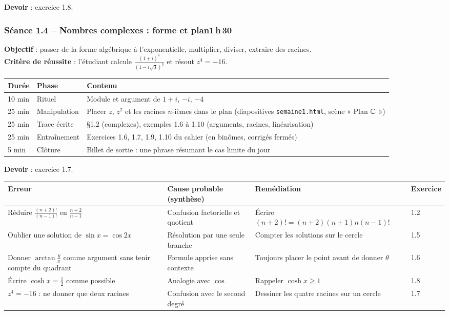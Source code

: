 \documentclass[10.5pt,a4paper]{article}
\newif\ifprof
\newcommand{\synth}{\textsf{\textcolor{ardoise}{(synthèse)}}}
\newcommand{\profonly}[1]{\ifprof #1\fi}
\begin{document}
\textbf{Devoir} : exercice 1.8.\profonly{ \textbf{Point de vigilance} : Cas $\cosh x=c<1$ sans solution réelle : à faire énoncer par un étudiant.}\par
{}\subsubsection*{\textcolor{marine}{Séance 1.4 -- Nombres complexes : forme et plan}\hfill\normalfont\small\textcolor{ardoise}{1\,h\,30}}
\begin{objectif}\textbf{Objectif} : passer de la forme algébrique à l'exponentielle, multiplier, diviser, extraire des racines.\\\textbf{Critère de réussite} : l'étudiant calcule $\frac{(1+i)^8}{(1-i\sqrt3)^3}$ et résout $z^4=-16$.\end{objectif}\nopagebreak
\begin{longtable}{@{}p{1.1cm}p{2.4cm}p{12.4cm}@{}}
\toprule \textbf{Durée} & \textbf{Phase} & \textbf{Contenu}\\ \midrule\endhead
10 min & Rituel & Module et argument de $1+i$, $-i$, $-4$\\
25 min & Manipulation & Placer $z$, $z^2$ et les racines $n$-ièmes dans le plan (diapositives \texttt{semaine1.html}, scène « Plan $\mathbb{C}$ »)\\
25 min & Trace écrite & \S1.2 (complexes), exemples 1.6 à 1.10 (arguments, racines, linéarisation)\\
25 min & Entraînement & Exercices 1.6, 1.7, 1.9, 1.10 du cahier (en binômes, corrigés fermés)\\
5 min & Clôture & Billet de sortie : une phrase résumant le cas limite du jour\\ \bottomrule\end{longtable}\nopagebreak
\textbf{Devoir} : exercice 1.7.\profonly{ \textbf{Point de vigilance} : Argument de $0$ indéfini ; $z^n=0\Rightarrow z=0$ : source d'erreurs récurrente.}\par
\ifprof
\begin{longtable}{@{}p{4.8cm}p{3.6cm}p{4.9cm}p{1.6cm}@{}}
\toprule \textbf{Erreur} & \textbf{Cause probable \synth} & \textbf{Remédiation} & \textbf{Exercice}\\ \midrule\endhead
Réduire $\frac{(n+2)!}{(n-1)!}$ en $\frac{n+2}{n-1}$ & Confusion factorielle et quotient & Écrire $(n+2)!=(n+2)(n+1)n(n-1)!$ & 1.2\\
Oublier une solution de $\sin x=\cos2x$ & Résolution par une seule branche & Compter les solutions sur le cercle & 1.5\\
Donner $\arctan\frac yx$ comme argument sans tenir compte du quadrant & Formule apprise sans contexte & Toujours placer le point avant de donner $\theta$ & 1.6\\
Écrire $\cosh x=\frac12$ comme possible & Analogie avec $\cos$ & Rappeler $\cosh x\ge1$ & 1.8\\
$z^4=-16$ : ne donner que deux racines & Confusion avec le second degré & Dessiner les quatre racines sur un cercle & 1.7\\
\bottomrule\end{longtable}
\end{document}
